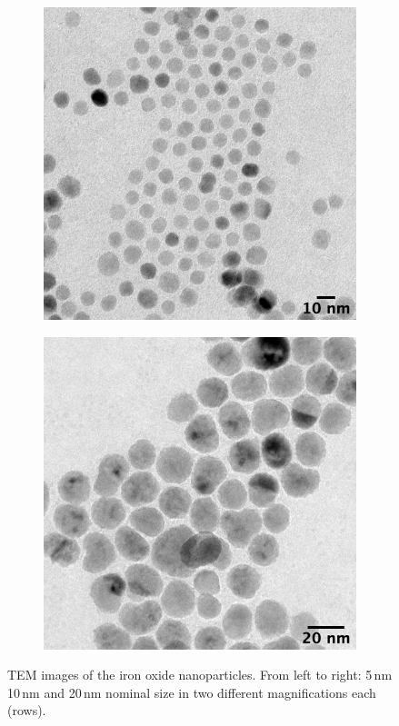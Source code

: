 \begin{figure}
\begin{subfigure}[b]{0.25\textwidth}
	\end{subfigure}
	\begin{subfigure}[b]{0.25\textwidth}
		\includegraphics[width=\linewidth]{images/temh10.png}
	\end{subfigure}
	\begin{subfigure}[b]{0.25\textwidth}
		\includegraphics[width=\linewidth]{images/temh20.png}
	\end{subfigure}
\caption[TEM images of iron oxide nanoparticle]{TEM images of the iron oxide nanoparticles. From left to right: 5\,nm 10\,nm and 20\,nm nominal size in two different magnifications each (rows).}
\label{fig:tem}
\end{figure}

